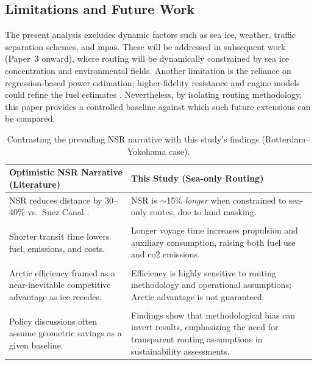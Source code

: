 \subsection{Limitations and Future Work}
The present analysis excludes dynamic factors such as sea ice, weather, traffic separation schemes, and \acp{mpa}. These will be addressed in subsequent work (Paper~3 onward), where routing will be dynamically constrained by sea ice concentration and environmental fields. Another limitation is the reliance on regression-based power estimation; higher-fidelity resistance and engine models could refine the fuel estimates \citep{Psaraftis2019}. Nevertheless, by isolating routing methodology, this paper provides a controlled baseline against which such future extensions can be compared.


\begin{table}[t]
\centering
\caption{Contrasting the prevailing NSR narrative with this study's findings (Rotterdam--Yokohama case).}
\label{tab:nsr_contrast}
\begin{tabular}{p{} p{}}
\toprule
\textbf{Optimistic NSR Narrative (Literature)} & \textbf{This Study (Sea-only Routing)} \\
\midrule
NSR reduces distance by 30--40\% vs.\ Suez Canal \citep{LiuKronbak2010,SchoyenBrathen2011,Yumashev2017}. & NSR is $\sim$15\% \emph{longer} when constrained to sea-only routes, due to land masking. \\
\\
Shorter transit time lowers fuel, emissions, and costs. & Longer voyage time increases propulsion and auxiliary consumption, raising both fuel use and \ac{co2} emissions. \\
\\
Arctic efficiency framed as a near-inevitable competitive advantage as ice recedes. & Efficiency is highly sensitive to routing methodology and operational assumptions; Arctic advantage is not guaranteed. \\
\\
Policy discussions often assume geometric savings as a given baseline. & Findings show that methodological bias can invert results, emphasizing the need for transparent routing assumptions in sustainability assessments. \\
\bottomrule
\end{tabular}
\end{table}

